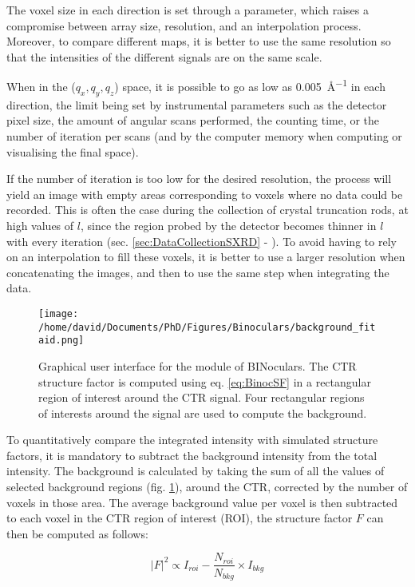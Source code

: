 The voxel size in each direction is set through a parameter, which raises a compromise between array size, resolution, and an interpolation process.
Moreover, to compare different maps, it is better to use the same resolution so that the intensities of the different signals are on the same scale.

When in the ($q_x, q_y, q_z$) space, it is possible to go as low as \qty{0.005}{\angstrom^{-1}} in each direction, the limit being set by instrumental parameters such as the detector pixel size, the amount of angular scans performed, the counting time, or the number of iteration per scans (and by the computer memory when computing or visualising the final space).

If the number of iteration is too low for the desired resolution, the process will yield an image with empty areas corresponding to voxels where no data could be recorded.
This is often the case during the collection of crystal truncation rods, at high values of $l$, since the region probed by the detector becomes thinner in $l$ with every iteration (sec. \ref{sec:DataCollectionSXRD} - \cite{Drnec2014}).
To avoid having to rely on an interpolation to fill these voxels, it is better to use a larger resolution when concatenating the images, and then to use the same step when integrating the data.

\begin{figure}[!htb]
    \texttt{[image: /home/david/Documents/PhD/Figures/Binoculars/background\_fitaid.png]}
    \caption{
        Graphical user interface for the  module of BINoculars.
        The CTR structure factor is computed using eq. \ref{eq:BinocSF} in a rectangular region of interest around the CTR signal.
        Four rectangular regions of interests around the signal are used to compute the background.
    }
    \label{fig:BinocularsBackground}
\end{figure}

To quantitatively compare the integrated intensity with simulated structure factors, it is mandatory to subtract the background intensity from the total intensity.
The background is calculated by taking the sum of all the values of selected background regions (fig. \ref{fig:BinocularsBackground}), around the CTR, corrected by the number of voxels in those area.
The average background value per voxel is then subtracted to each voxel in the CTR region of interest (ROI), the structure factor $F$ can then be computed as follows:

\begin{equation}
    |F|^2 \propto I_{roi} - \frac{N_{roi}}{N_{bkg}} \times I_{bkg}
    \label{eq:BinocSF}
\end{equation}

